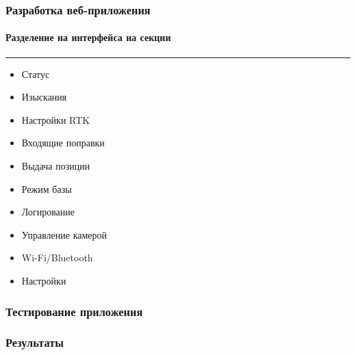 \documentclass[xetex,t]{beamer}
\begin{document}
%
%
\begin{frame}
  \frametitle{Разработка веб-приложения}
  \framesubtitle{Разделение на интерфейса на секции}

  \begin{minipage}[c]{\textwidth}
    \centering
    \begin{minipage}[t]{.45\textwidth}
      \rule{\textwidth}{0.4pt}
      \begin{itemize}
        \item<1> Статус
        \item<2> Изыскания
        \item<3> Настройки RTK
        \item<4> Входящие поправки
        \item<5> Выдача позиции
        \item<6> Режим базы
        \item<7> Логирование
        \item<8> Управление камерой
        \item<9> Wi-Fi/Bluetooth
        \item<10> Настройки
      \end{itemize}
    \end{minipage}
    \hspace{1em}
    \begin{minipage}[t]{.45\textwidth}
    \end{minipage}
  \end{minipage}
\end{frame}


%
%
\begin{frame}
  \frametitle{Тестирование приложения}
\end{frame}


%
%
\begin{frame}
  \frametitle{Результаты}
\end{frame}


%
%
\begin{frame}[c]
\begin{center}
  \Huge\bfseries
  \color{ifmoblue}{Спасибо за внимание}
\end{center}
\end{frame}
\end{document}

